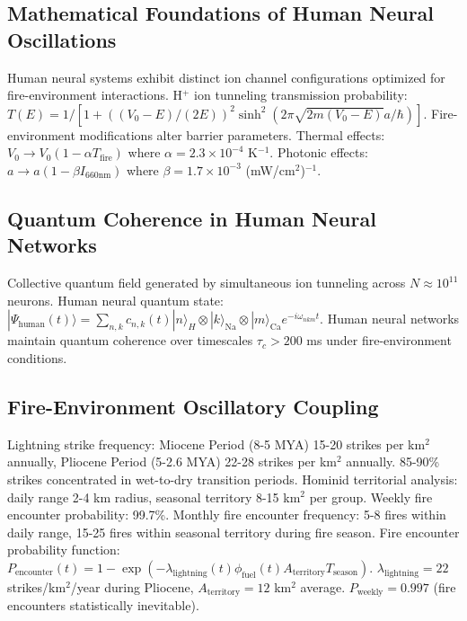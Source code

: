 \documentclass[12pt,a4paper]{article}
\begin{document}
\subsection{Mathematical Foundations of Human Neural Oscillations}

Human neural systems exhibit distinct ion channel configurations optimized for fire-environment interactions. H$^+$ ion tunneling transmission probability: $T(E) = 1/[1 + ((V_0 - E)/(2E))^2 \sinh^2(2\pi\sqrt{2m(V_0 - E)}a/\hbar)]$. Fire-environment modifications alter barrier parameters. Thermal effects: $V_0 \to V_0(1 - \alpha T_{\text{fire}})$ where $\alpha = 2.3 \times 10^{-4}$ K$^{-1}$. Photonic effects: $a \to a(1 - \beta I_{660\text{nm}})$ where $\beta = 1.7 \times 10^{-3}$ (mW/cm$^2$)$^{-1}$.

\subsection{Quantum Coherence in Human Neural Networks}

Collective quantum field generated by simultaneous ion tunneling across $N \approx 10^{11}$ neurons. Human neural quantum state: $|\Psi_{\text{human}}(t)\rangle = \sum_{n,k} c_{n,k}(t) |n\rangle_H \otimes |k\rangle_{\text{Na}} \otimes |m\rangle_{\text{Ca}} e^{-i\omega_{nkm}t}$. Human neural networks maintain quantum coherence over timescales $\tau_c > 200$ ms under fire-environment conditions.

\subsection{Fire-Environment Oscillatory Coupling}

Lightning strike frequency: Miocene Period (8-5 MYA) 15-20 strikes per km$^2$ annually, Pliocene Period (5-2.6 MYA) 22-28 strikes per km$^2$ annually. 85-90\% strikes concentrated in wet-to-dry transition periods. Hominid territorial analysis: daily range 2-4 km radius, seasonal territory 8-15 km$^2$ per group. Weekly fire encounter probability: 99.7\%. Monthly fire encounter frequency: 5-8 fires within daily range, 15-25 fires within seasonal territory during fire season. Fire encounter probability function: $P_{\text{encounter}}(t) = 1 - \exp(-\lambda_{\text{lightning}}(t) \phi_{\text{fuel}}(t) A_{\text{territory}} T_{\text{season}})$. $\lambda_{\text{lightning}} = 22$ strikes/km$^2$/year during Pliocene, $A_{\text{territory}} = 12$ km$^2$ average. $P_{\text{weekly}} = 0.997$ (fire encounters statistically inevitable).
\end{document}
